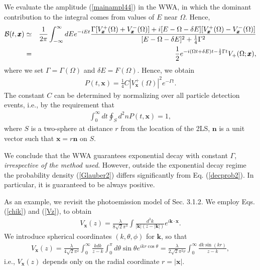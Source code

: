 \documentclass[12pt]{article}
\numberwithin{equation}{section}
\begin{document}
We evaluate the amplitude (\ref{mainampl44})  in the WWA, in which the dominant contribution to the integral comes
 from values of $E$ near $\Omega$. Hence,
\begin{eqnarray}
{\cal B}(t,  {\pmb x}) &\simeq&
  \frac{1}{2 \pi }  \int_{-\infty }^{\infty } dE e^{-iEt}  \frac{ \Gamma  [V_{\pmb x}^+(\Omega) +V_{\pmb x}^-(\Omega) ]  + i [E - \Omega - \delta E][V_{\pmb x}^+(\Omega)  - V_{\pmb x}^-(\Omega) ]   }{ [E - \Omega - \delta E]^2 + \frac{1}{4}\Gamma^2} \nonumber \\
&=& \frac{1}{2} e^{-i (\Omega t + \delta E)t - \frac{1}{2}\Gamma t}   V_+(\Omega; {\pmb x})   , \label{mainampl44b}
\end{eqnarray}
where we set $\Gamma = \Gamma(\Omega)$ and $\delta E = F(\Omega)$. Hence, we obtain
\begin{eqnarray}
P(t, {\pmb x})  = \frac{1}{4} C|V_{\pmb x}^+(\Omega) |^2 e^{-\Gamma t}. \label{decayGl}
\end{eqnarray}
The constant $C$ can be determined by normalizing over all particle detection events, i.e., by the requirement that
\begin{eqnarray}
\int_0^{\infty} dt \oint_{S} d^2n  P(t, {\pmb x}) =1  , \label{normalk}
\end{eqnarray}
where $S$ is a two-sphere at distance $r$ from the location of the 2LS, ${\pmb n}$ is a unit vector such that ${\pmb x} = r {\pmb n}$ on $S$.

We conclude  that the WWA guarantees exponential decay with constant $\Gamma$, {\em irrespective of the method used}. However, outside the exponential decay regime the probability density (\ref{Glauber2}) differs significantly from Eq. (\ref{decprob2}). In particular, it is guaranteed to be always positive.



\medskip

As an example, we revisit the photoemission model of Sec. 3.1.2. We employ Eqs. (\ref{chik}) and (\ref{Vz}), to obtain
\begin{eqnarray}
V_{\pmb x}(z) = \frac{\lambda}{8\sqrt{2} \pi^3} \int \frac{d^3k}{|{\pmb k}|(z - |{\pmb k}|)} e^{i {\pmb k} \cdot {\pmb x}}.
\end{eqnarray}
We introduce spherical coordinates $(k, \theta, \phi)$ for ${\pmb k}$, so that
\begin{eqnarray}
V_{\pmb x}(z) = \frac{\lambda}{4\sqrt{2} \pi^2} \int_0^{\infty} \frac{kdk}{z- k} \int_0^{\pi} d\theta \sin \theta e^{ikr \cos \theta} =
 \frac{\lambda}{2\sqrt{2} \pi^2 r} \int_0^{\infty} \frac{dk \sin(kr)}{z-k}, \label{vzr}
\end{eqnarray}
i.e., $V_{\pmb x}(z)$ depends only on the radial coordinate $r = |{\pmb x}|$.
\end{document}
